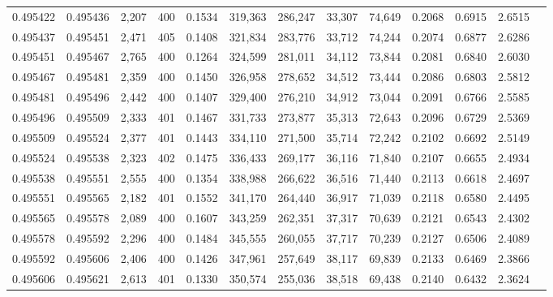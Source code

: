 \begin{tabular}{rrrrrrrrrrrrr}
0.495422 & 0.495436 & 2,207 & 400 &                                     0.1534 & 319,363 & 286,247 &  33,307 &  74,649 & 0.2068 & 0.6915 & 2.6515 \\
0.495437 & 0.495451 & 2,471 & 405 &                                     0.1408 & 321,834 & 283,776 &  33,712 &  74,244 & 0.2074 & 0.6877 & 2.6286 \\
0.495451 & 0.495467 & 2,765 & 400 &                                     0.1264 & 324,599 & 281,011 &  34,112 &  73,844 & 0.2081 & 0.6840 & 2.6030 \\
0.495467 & 0.495481 & 2,359 & 400 &                                     0.1450 & 326,958 & 278,652 &  34,512 &  73,444 & 0.2086 & 0.6803 & 2.5812 \\
0.495481 & 0.495496 & 2,442 & 400 &                                     0.1407 & 329,400 & 276,210 &  34,912 &  73,044 & 0.2091 & 0.6766 & 2.5585 \\
0.495496 & 0.495509 & 2,333 & 401 &                                     0.1467 & 331,733 & 273,877 &  35,313 &  72,643 & 0.2096 & 0.6729 & 2.5369 \\
0.495509 & 0.495524 & 2,377 & 401 &                                     0.1443 & 334,110 & 271,500 &  35,714 &  72,242 & 0.2102 & 0.6692 & 2.5149 \\
0.495524 & 0.495538 & 2,323 & 402 &                                     0.1475 & 336,433 & 269,177 &  36,116 &  71,840 & 0.2107 & 0.6655 & 2.4934 \\
0.495538 & 0.495551 & 2,555 & 400 &                                     0.1354 & 338,988 & 266,622 &  36,516 &  71,440 & 0.2113 & 0.6618 & 2.4697 \\
0.495551 & 0.495565 & 2,182 & 401 &                                     0.1552 & 341,170 & 264,440 &  36,917 &  71,039 & 0.2118 & 0.6580 & 2.4495 \\
0.495565 & 0.495578 & 2,089 & 400 &                                     0.1607 & 343,259 & 262,351 &  37,317 &  70,639 & 0.2121 & 0.6543 & 2.4302 \\
0.495578 & 0.495592 & 2,296 & 400 &                                     0.1484 & 345,555 & 260,055 &  37,717 &  70,239 & 0.2127 & 0.6506 & 2.4089 \\
0.495592 & 0.495606 & 2,406 & 400 &                                     0.1426 & 347,961 & 257,649 &  38,117 &  69,839 & 0.2133 & 0.6469 & 2.3866 \\
0.495606 & 0.495621 & 2,613 & 401 &                                     0.1330 & 350,574 & 255,036 &  38,518 &  69,438 & 0.2140 & 0.6432 & 2.3624 \\

\end{tabular}
